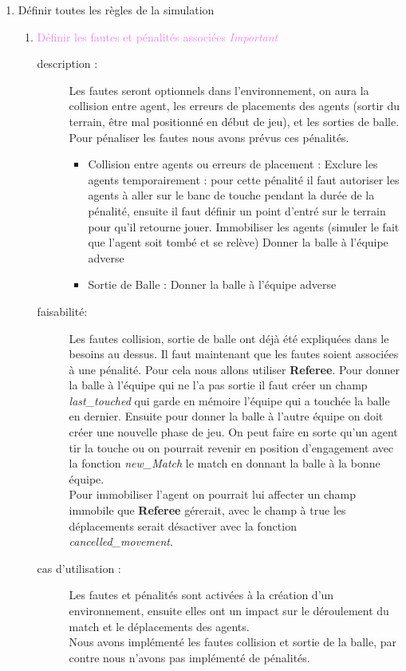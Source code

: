 \documentclass[11pt, a4paper]{article}
\newcommand{\besoinVItem}[4]{
	\item #1
	\begin{description}
		\item[description :]
		#2
		\item[faisabilité: ]
		#3
		\item[cas d'utilisation :]
		#4
	\end{description}
}
\begin{document}
\begin{enumerate}
		\item Définir toutes les règles de la simulation
		\begin{enumerate}
			\besoinVItem{\textcolor{violet}{Définir les fautes et pénalités associées \textit{Important}}
			}
			{Les fautes seront optionnels dans l'environnement, on aura la collision entre agent, les erreurs de placements des agents (sortir du terrain, être mal positionné en début de jeu), et les sorties de balle. Pour pénaliser les fautes nous avons prévus ces pénalités.
				\begin{itemize}
					\item Collision entre agents ou erreurs de placement :
					\subitem Exclure les agents temporairement : pour cette pénalité il faut autoriser les agents à aller sur le banc de touche  pendant la durée de la pénalité, ensuite il faut définir un point d'entré sur le terrain pour qu'il retourne jouer.
					\subitem Immobiliser les agents (simuler le fait que l'agent soit tombé et se relève)
					\subitem Donner la balle à l'équipe adverse
					\item Sortie de Balle :
					\subitem Donner la balle à l'équipe adverse
				\end{itemize}
			}
			{Les fautes collision, sortie de balle ont déjà été expliquées dans le besoins au dessus. Il faut maintenant que les fautes soient associées à une pénalité. Pour cela nous allons utiliser \textbf{Referee}. Pour donner la balle à l'équipe qui ne l'a pas sortie il faut créer un champ \textit{last\_touched} qui garde en mémoire l'équipe qui a touchée la balle en dernier. Ensuite pour donner la balle à l'autre équipe on doit créer une nouvelle phase de jeu. On peut faire en sorte qu'un agent tir la touche ou on pourrait revenir en position d'engagement avec la fonction \textit{new\_Match} le match en donnant la balle à la bonne équipe.\\
			Pour immobiliser l'agent on pourrait lui affecter un champ immobile que \textbf{Referee} gérerait, avec le champ à true les déplacements serait désactiver avec la fonction \textit{cancelled\_movement}.
			}
			{Les fautes et pénalités sont activées à la création d'un environnement, ensuite elles ont un impact sur le déroulement du match et le déplacements des agents.\\
			Nous avons implémenté les fautes collision et sortie de la balle, par contre nous n'avons pas implémenté de pénalités. }



\end{enumerate}
\end{enumerate}
\end{document}
